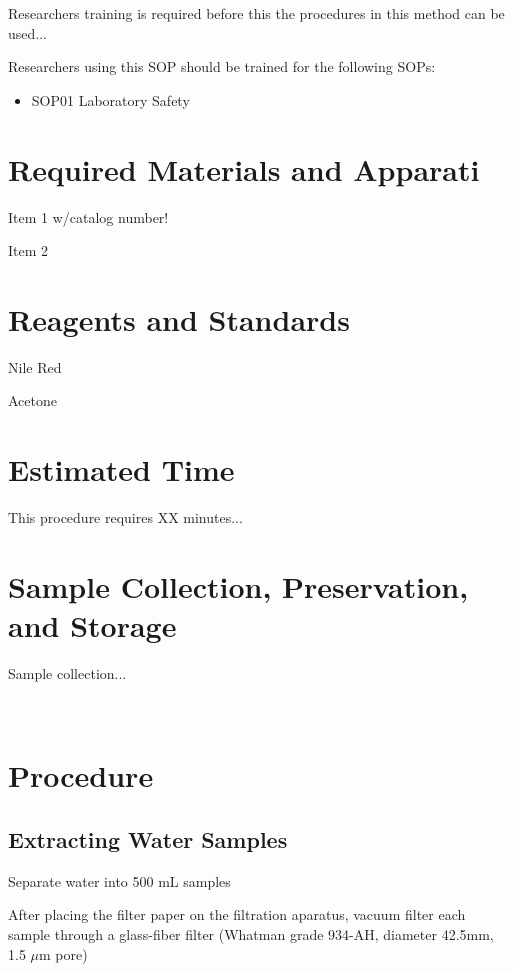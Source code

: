\documentclass[12pt]{../SOP4_alpha}\usepackage[]{graphicx}\usepackage[]{color}
\begin{document}
\NP Researchers training is required before this the procedures in this method can be used... 

\NP Researchers using this SOP should be trained for the following SOPs:

\begin{itemize}
  \item SOP01 Laboratory Safety
\end{itemize}

\section{Required Materials and Apparati}

\NP Item 1 w/catalog number!

\NP Item 2

\section{Reagents and Standards}

\NP Nile Red

\NP Acetone

\section{Estimated Time}

\NP This procedure requires XX minutes...

\section{Sample Collection, Preservation, and Storage}

\NP Sample collection...

\

\section{Procedure}



\subsection{Extracting Water Samples}

\NP Separate water into 500 mL samples

\NP After placing the filter paper on the filtration aparatus, vacuum filter each sample through a glass-fiber filter (Whatman grade 934-AH, diameter 42.5mm, 1.5 $\mu$m pore)
\end{document}
